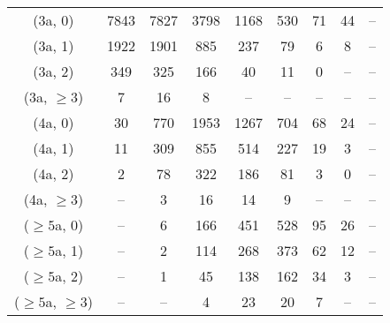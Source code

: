 \begin{table}[h!]
{\begin{tabular}{ccccccccc}
	(3a, 0) & 7843 & 7827 & 3798 & 1168 & 530 & 71 & 44 & -- \\[0.5ex] 
	(3a, 1) & 1922 & 1901 & 885 & 237 & 79 & 6 & 8 & -- \\[0.5ex] 
	(3a, 2) & 349 & 325 & 166 & 40 & 11 & 0 & -- & -- \\[0.5ex] 
	(3a, $\ge3$) & 7 & 16 & 8 & -- & -- & -- & -- & -- \\[0.5ex] 
	(4a, 0) & 30 & 770 & 1953 & 1267 & 704 & 68 & 24 & -- \\[0.5ex] 
	(4a, 1) & 11 & 309 & 855 & 514 & 227 & 19 & 3 & -- \\[0.5ex] 
	(4a, 2) & 2 & 78 & 322 & 186 & 81 & 3 & 0 & -- \\[0.5ex] 
	(4a, $\ge3$) & -- & 3 & 16 & 14 & 9 & -- & -- & -- \\[0.5ex] 
	($\ge5$a, 0) & -- & 6 & 166 & 451 & 528 & 95 & 26 & -- \\[0.5ex] 
	($\ge5$a, 1) & -- & 2 & 114 & 268 & 373 & 62 & 12 & -- \\[0.5ex] 
	($\ge5$a, 2) & -- & 1 & 45 & 138 & 162 & 34 & 3 & -- \\[0.5ex] 
	($\ge5$a, $\ge3$) & -- & -- & 4 & 23 & 20 & 7 & -- & -- \\[0.5ex] 
	\hline
	\hline
\end{tabular}}
\end{table}
